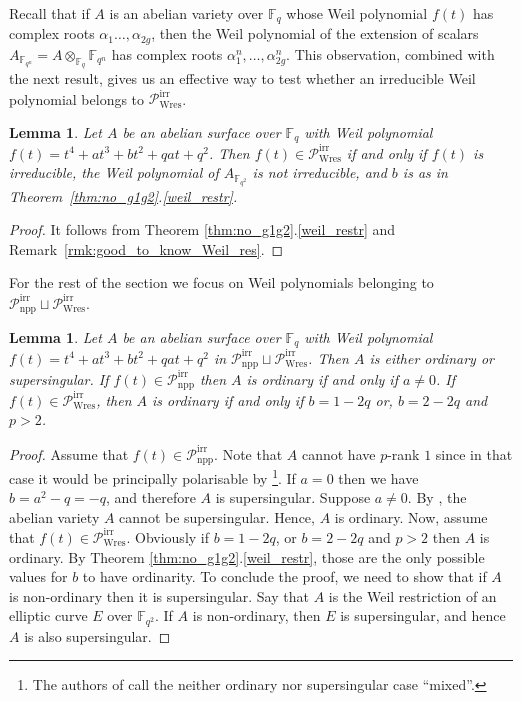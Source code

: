 \documentclass[11pt]{amsart}
\newcommand\F{\mathbb{F}}
\newcommand\Fq{\mathbb{F}_q}
\theoremstyle{plain}
\newtheorem{lemma}[theorem]{Lemma}
\theoremstyle{definition}
\newcommand\PirrA{\mathcal{P}^\mathrm{irr}_\mathrm{npp}}
\newcommand\PirrB{\mathcal{P}^\mathrm{irr}_\mathrm{Wres}}
\begin{document}
Recall that if $A$ is an abelian variety over $\Fq$ whose Weil polynomial $f(t)$ has complex roots $\alpha_1\ldots,\alpha_{2g}$, then the Weil polynomial of the extension of scalars $A_{\F_{q^n}}=A \otimes_{\Fq} \F_{q^n}$ has complex roots $\alpha_1^n,\ldots,\alpha_{2g}^n$.
This observation, combined with the next result, gives us an effective way to test whether an irreducible Weil polynomial belongs to $\PirrB$.

\begin{lemma}\label{lemma:PirrB_char}
    Let $A$ be an abelian surface over $\Fq$ with Weil polynomial $f(t)=t^4+at^3+bt^2+qat+q^2$.
    Then $f(t) \in \PirrB$ if and only if $f(t)$ is irreducible, the Weil polynomial
    of $A_{\F_{q^2}}$ is not irreducible, and $b$ is as in Theorem~\ref{thm:no_g1g2}.\ref{weil_restr}.
\end{lemma}
\begin{proof}
    It follows from Theorem \ref{thm:no_g1g2}.\ref{weil_restr} and Remark~\ref{rmk:good_to_know_Weil_res}.
\end{proof}


For the rest of the section we focus on Weil polynomials belonging to $\PirrA\sqcup\PirrB$.

\begin{lemma}\label{lem:Pirrordinary}
    Let $A$ be an abelian surface over $\Fq$ with Weil polynomial $f(t)=t^4+at^3+bt^2+qat+q^2$ in $\PirrA\sqcup\PirrB$. Then $A$ is either ordinary or supersingular. 
    If $f(t)\in\PirrA$ then $A$ is ordinary if and only if $a\neq 0$. If $f(t)\in\PirrB$, then $A$ is ordinary if and only if $b = 1-2q$ or, $b=2-2q$ and $p>2$.
\end{lemma}
\begin{proof}
    Assume that $f(t)\in\PirrA$.  Note that $A$ cannot have $p$-rank $1$ since in that case it would be principally polarisable by \cite[Thm.~4.3]{MN02}\footnote{The authors of \cite{MN02} call the neither ordinary nor supersingular case ``mixed''.}. 
    If $a=0$ then we have $b=a^2-q=-q$, and therefore $A$ is supersingular. 
    Suppose $a\neq 0$. By \cite[Thm.~2]{HMNR08}, the abelian variety $A$ cannot be supersingular. Hence, $A$ is ordinary.  
    Now, assume that $f(t)\in\PirrB$. 
    Obviously if $b = 1-2q$, or $b=2-2q$ and $p>2$ then $A$ is ordinary. 
    By Theorem  \ref{thm:no_g1g2}.\ref{weil_restr}, those are the only possible values for $b$ to have ordinarity.
    To conclude the proof, we need to show that if $A$ is non-ordinary then it is supersingular.
    Say that $A$ is the Weil restriction of an elliptic curve $E$ over $\F_{q^2}$. 
    If $A$ is non-ordinary, then $E$ is supersingular, and hence $A$ is also supersingular.
\end{proof}
\end{document}
